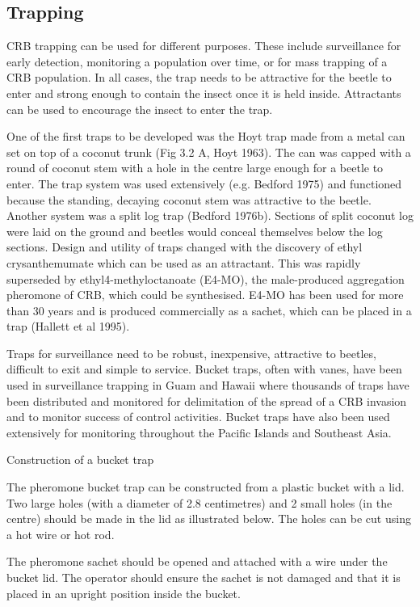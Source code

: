 \documentclass[twocolumn,letterpaper]{scrartcl}
\begin{document}
\subsection{Trapping}

CRB trapping can be used for different purposes. These include surveillance for early detection, monitoring a population over time, or for mass trapping of a CRB population. In all cases, the trap needs to be attractive for 
the beetle to enter and strong enough to contain the insect once it is held inside. Attractants can be used to encourage the insect to enter the trap. 

One of the first traps to be developed was the Hoyt trap made from a metal can set on top of a coconut trunk (Fig 3.2 A, Hoyt 1963). The can was capped with a round of coconut stem with a hole in the centre large enough for a beetle to enter. The trap system was used extensively (e.g. Bedford 1975) and functioned because the standing, decaying coconut stem was attractive to the beetle. Another system was a split log trap (Bedford 1976b). Sections of split coconut log were laid on the ground and beetles would conceal themselves below the log sections. Design and utility of traps changed with the discovery of ethyl crysanthemumate which can be used as an attractant. This was rapidly superseded by ethyl4-methyloctanoate (E4-MO), the male-produced aggregation pheromone of CRB, which could be synthesised. E4-MO has been used for more than 30 years and is produced commercially as a sachet, which can be placed in a trap (Hallett et al 1995). 

Traps for surveillance need to be robust, inexpensive, attractive to beetles, difficult to exit and simple to service. Bucket traps, often with vanes, have been used in surveillance trapping in Guam and Hawaii where thousands of traps have been distributed and monitored for delimitation of the spread of a CRB invasion and to monitor success of control activities. Bucket traps have also been used extensively for monitoring throughout the Pacific Islands and Southeast Asia. 

Construction of a bucket trap

The pheromone bucket trap can be constructed from a plastic bucket with a lid. Two large holes (with a diameter 
of 2.8 centimetres) and 2 small holes (in the centre) should be made in the lid as illustrated below. The holes can 
be cut using a hot wire or hot rod. 

The pheromone sachet should be opened and attached with a wire under the bucket lid. The operator should 
ensure the sachet is not damaged and that it is placed in an upright position inside the bucket. 
\end{document}
